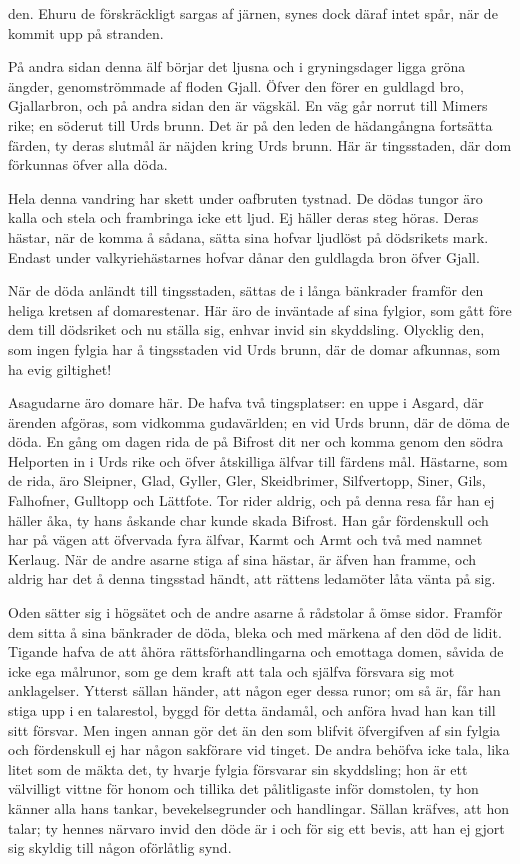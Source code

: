 den. Ehuru de förskräckligt sargas af järnen, synes dock däraf intet
spår, när de kommit upp på stranden.

På andra sidan denna älf börjar det ljusna och i gryningsdager ligga
gröna ängder, genomströmmade af floden Gjall. Öfver den förer en
guldlagd bro, Gjallarbron, och på andra sidan den är vägskäl. En väg går
norrut till Mimers rike; en söderut till Urds brunn. Det är på den leden
de hädangångna fortsätta färden, ty deras slutmål är näjden kring Urds
brunn. Här är tingsstaden, där dom förkunnas öfver alla döda.

Hela denna vandring har skett under oafbruten tystnad. De dödas tungor
äro kalla och stela och frambringa icke ett ljud. Ej häller deras steg
höras. Deras hästar, när de komma å sådana, sätta sina hofvar ljudlöst
på dödsrikets mark. Endast under valkyriehästarnes hofvar dånar den
guldlagda bron öfver Gjall.

När de döda anländt till tingsstaden, sättas de i långa bänkrader
framför den heliga kretsen af domarestenar. Här äro de inväntade af sina
fylgior, som gått före dem till dödsriket och nu ställa sig, enhvar
invid sin skyddsling. Olycklig den, som ingen fylgia har å tingsstaden
vid Urds brunn, där de domar afkunnas, som ha evig giltighet!

Asagudarne äro domare här. De hafva två tingsplatser: en uppe i Asgard,
där ärenden afgöras, som vidkomma gudavärlden; en vid Urds brunn, där de
döma de döda. En gång om dagen rida de på Bifrost dit ner och komma
genom den södra Helporten in i Urds rike och öfver åtskilliga älfvar
till färdens mål. Hästarne, som de rida, äro Sleipner, Glad, Gyller,
Gler, Skeidbrimer, Silfvertopp, Siner, Gils, Falhofner, Gulltopp och
Lättfote. Tor rider aldrig, och på denna resa får han ej häller åka, ty
hans åskande char kunde skada Bifrost. Han går fördenskull och har på
vägen att öfvervada fyra älfvar, Karmt och Armt och två med namnet
Kerlaug. När de andre asarne stiga af sina hästar, är äfven han framme,
och aldrig har det å denna tingsstad händt, att rättens ledamöter låta
vänta på sig.



Oden sätter sig i högsätet och de andre asarne å rådstolar å ömse sidor.
Framför dem sitta å sina bänkrader de döda, bleka och med märkena af den
död de lidit. Tigande hafva de att åhöra rättsförhandlingarna och
emottaga domen, såvida de icke ega målrunor, som ge dem kraft att tala
och själfva försvara sig mot anklagelser. Ytterst sällan händer, att
någon eger dessa runor; om så är, får han stiga upp i en talarestol,
byggd för detta ändamål, och anföra hvad han kan till sitt försvar. Men
ingen annan gör det än den som blifvit öfvergifven af sin fylgia och
fördenskull ej har någon sakförare vid tinget. De andra behöfva icke
tala, lika litet som de mäkta det, ty hvarje fylgia försvarar sin
skyddsling; hon är ett välvilligt vittne för honom och tillika det
pålitligaste inför domstolen, ty hon känner alla hans tankar,
bevekelsegrunder och handlingar. Sällan kräfves, att hon talar; ty
hennes närvaro invid den döde är i och för sig ett bevis, att han ej
gjort sig skyldig till någon oförlåtlig synd.

